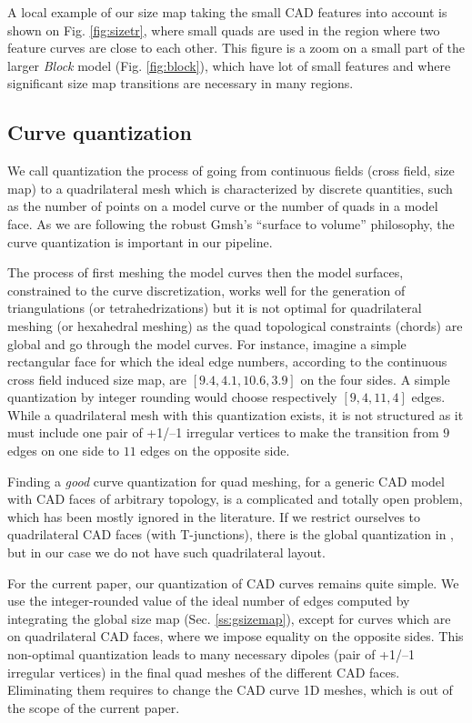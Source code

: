 \documentclass[AMA,STIX1COL]{WileyNJD-v2}
\newcommand\rsec[1]{Sec. \ref{#1}}
\newcommand\rfig[1]{Fig. \ref{#1}}
\begin{document}
{A local example of our size map taking the small CAD features into account is
shown on \rfig{fig:sizetr}, where small quads are used in the region where two
feature curves are close to each other. This figure is a zoom on a small part
of the larger \emph{Block} model (\rfig{fig:block}), which have lot of small features and
where significant size map transitions are necessary in many regions.


\subsection{Curve quantization}
\label{ss:curve}

We call quantization the process of going from continuous fields (cross field,
size map) to a quadrilateral mesh which is characterized by discrete
quantities, such as the number of points on a model curve or the number of
quads in a model face.  As we are following the robust Gmsh's ``surface to
volume'' philosophy, the curve quantization is important in our pipeline.

The process of first meshing the model curves then the model surfaces,
constrained to the curve discretization, works well for the generation of
triangulations (or tetrahedrizations) but it is not optimal for
quadrilateral meshing (or hexahedral meshing) as the quad topological
constraints (chords) are global and go through the model curves. For
instance, imagine a simple rectangular face for which the ideal edge
numbers, according to the continuous cross field induced size map, are $[9.4,
4.1, 10.6, 3.9]$ on the four sides. A simple quantization by integer rounding
would choose respectively $[9, 4, 11,4]$ edges. While a quadrilateral mesh with
this quantization exists, it is not structured as it must include one pair of
+1/--1 irregular vertices to make the transition from $9$ edges on one side to
$11$ edges on the opposite side.


Finding a \emph{good} curve quantization for quad meshing, for a generic CAD
model with CAD faces of arbitrary topology, is a complicated and totally open
problem, which has been mostly ignored in the literature.  If we restrict ourselves
to quadrilateral CAD faces (with T-junctions), there is the global quantization in
\cite{campen2015}, but in our case we do not have such quadrilateral layout.

For the current paper, our quantization of CAD curves remains quite simple.  We
use the integer-rounded value of the ideal number of edges computed by
integrating the global size map (\rsec{ss:gsizemap}), except for curves which
are on quadrilateral CAD faces, where we impose equality on the opposite sides.
This non-optimal quantization leads to many necessary dipoles (pair of +1/--1 irregular
vertices) in the final quad meshes of the different CAD faces. Eliminating them
requires to change the CAD curve 1D meshes, which is out of the scope of the current paper.

}
\end{document}
